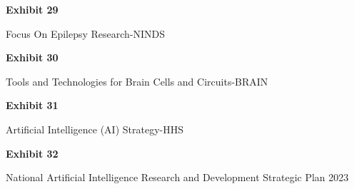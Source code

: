 \documentclass{article}
\begin{document}





\vspace*{\fill}
\begin{center}

{\LARGE \bf
Exhibit 29
}

\vspace{10\baselineskip}

{\large Focus On Epilepsy Research-NINDS}

\end{center}
\vspace*{\fill}






\vspace*{\fill}
\begin{center}

{\LARGE \bf
Exhibit 30
}

\vspace{10\baselineskip}

{\large Tools and Technologies for Brain Cells and Circuits-BRAIN}

\end{center}
\vspace*{\fill}

 

\vspace*{\fill}
\begin{center}

{\LARGE \bf
Exhibit 31
}

\vspace{10\baselineskip}

{\large Artificial Intelligence (AI) Strategy-HHS}

\end{center}
\vspace*{\fill}

 

\vspace*{\fill}
\begin{center}

{\LARGE \bf
Exhibit 32
}

\vspace{10\baselineskip}

{\large National Artificial Intelligence Research and Development Strategic Plan 2023}

\end{center}
\vspace*{\fill}
\end{document}
